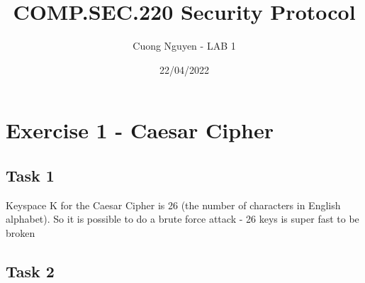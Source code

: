 \documentclass{article}
\title{COMP.SEC.220 Security Protocol}
\author{Cuong Nguyen - LAB 1}
\date{22/04/2022}
\begin{document}
    
\maketitle

\section*{Exercise 1 - Caesar Cipher}
%
\subsection*{Task 1}
%
Keyspace \textbar K \textbar for the Caesar Cipher is 26 (the number
of characters in English alphabet). So it is possible to do a brute
force attack - 26 keys is super fast to be broken

\subsection*{Task 2}
%
\end{document}
